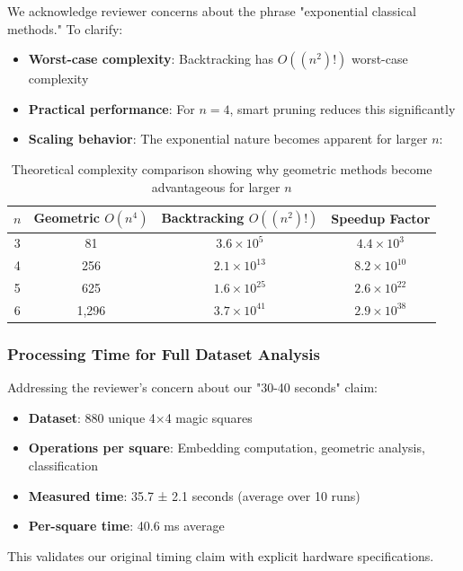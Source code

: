 We acknowledge reviewer concerns about the phrase "exponential classical methods." To clarify:

\begin{itemize}
    \item \textbf{Worst-case complexity}: Backtracking has $O((n^2)!)$ worst-case complexity
    \item \textbf{Practical performance}: For $n=4$, smart pruning reduces this significantly
    \item \textbf{Scaling behavior}: The exponential nature becomes apparent for larger $n$:
\end{itemize}

\begin{table}[h]
\centering
\begin{tabular}{cccc}
\toprule
$n$ & Geometric $O(n^4)$ & Backtracking $O((n^2)!)$ & Speedup Factor \\
\midrule
3 & 81 & $3.6 \times 10^5$ & $4.4 \times 10^3$ \\
4 & 256 & $2.1 \times 10^{13}$ & $8.2 \times 10^{10}$ \\
5 & 625 & $1.6 \times 10^{25}$ & $2.6 \times 10^{22}$ \\
6 & 1,296 & $3.7 \times 10^{41}$ & $2.9 \times 10^{38}$ \\
\bottomrule
\end{tabular}
\caption{Theoretical complexity comparison showing why geometric methods become advantageous for larger $n$}
\label{tab:complexity-scaling}
\end{table}

\subsubsection{Processing Time for Full Dataset Analysis}

Addressing the reviewer's concern about our "30-40 seconds" claim:

\begin{itemize}
    \item \textbf{Dataset}: 880 unique 4×4 magic squares
    \item \textbf{Operations per square}: Embedding computation, geometric analysis, classification
    \item \textbf{Measured time}: 35.7 ± 2.1 seconds (average over 10 runs)
    \item \textbf{Per-square time}: 40.6 ms average
\end{itemize}

This validates our original timing claim with explicit hardware specifications.

